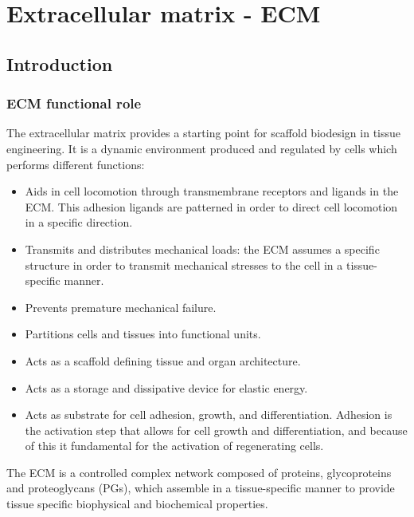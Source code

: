 \graphicspath{{chapters/03/images/}}
\chapter{Extracellular matrix - ECM}

\section{Introduction}

	\subsection{ECM functional role}
	The extracellular matrix provides a starting point for scaffold biodesign in tissue engineering.
	It is a dynamic environment produced and regulated by cells which performs different functions:

	\begin{multicols}{2}
		\begin{itemize}
			\item Aids in cell locomotion through transmembrane receptors and ligands in the ECM.
				This adhesion ligands are patterned in order to direct cell locomotion in a specific direction.
			\item Transmits and distributes mechanical loads: the ECM assumes a specific structure in order to transmit mechanical stresses to the cell in a tissue-specific manner.
			\item Prevents premature mechanical failure.
			\item Partitions cells and tissues into functional units.
			\item Acts as a scaffold defining tissue and organ architecture.
			\item Acts as a storage and dissipative device for elastic energy.
			\item Acts as substrate for cell adhesion, growth, and differentiation.
				Adhesion is the activation step that allows for cell growth and differentiation, and because of this it fundamental for the activation of regenerating cells.
		\end{itemize}
	\end{multicols}

	The ECM is a controlled complex network composed of proteins, glycoproteins and proteoglycans (PGs), which assemble in a tissue-specific manner to provide tissue specific biophysical and biochemical properties.

